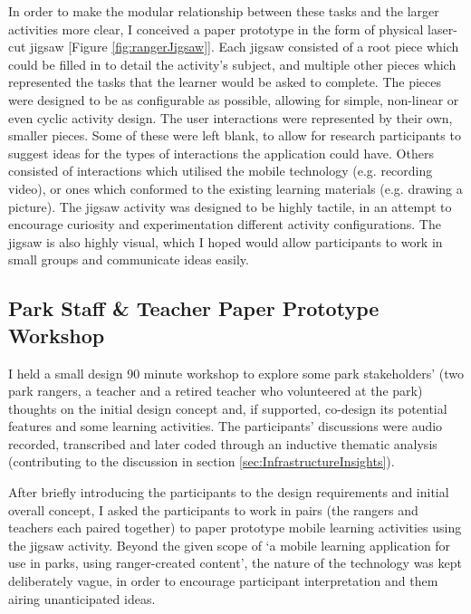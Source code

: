 In order to make the modular relationship between these tasks and the larger activities more clear, I conceived a paper prototype in the form of physical laser-cut jigsaw [Figure \ref{fig:rangerJigsaw}]. Each jigsaw consisted of a root piece which could be filled in to detail the activity’s subject, and multiple other pieces which represented the tasks that the learner would be asked to complete. The pieces were designed to be as configurable as possible, allowing for simple, non-linear or even cyclic activity design. The user interactions were represented by their own, smaller pieces. Some of these were left blank, to allow for research participants to suggest ideas for the types of interactions the application could have. Others consisted of interactions which utilised the mobile technology (e.g. recording video), or ones which conformed to the existing learning materials (e.g. drawing a picture). The jigsaw activity was designed to be highly tactile, in an attempt to encourage curiosity and experimentation different activity configurations. The jigsaw is also highly visual, which I hoped would allow participants to work in small groups and communicate ideas easily.

\subsection{Park Staff \& Teacher Paper Prototype Workshop}
\label{sec:PrototypeWorkshop}

I held a small design 90 minute workshop to explore some park stakeholders’ (two park rangers, a teacher and a retired teacher who volunteered at the park) thoughts on the initial design concept and, if supported, co-design its potential features and some learning activities. The participants' discussions were audio recorded, transcribed and later coded through an inductive thematic analysis (contributing to the discussion in section \ref{sec:InfrastructureInsights}).

After briefly introducing the participants to the design requirements and initial overall concept, I asked the participants to work in pairs (the rangers and teachers each paired together) to paper prototype mobile learning activities using the jigsaw activity. Beyond the given scope of `a mobile learning application for use in parks, using ranger-created content', the nature of the technology was kept deliberately vague, in order to encourage participant interpretation and them airing unanticipated ideas.

